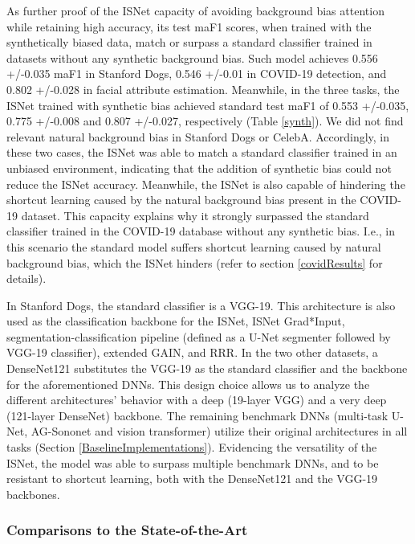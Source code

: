 \documentclass[fleqn,10pt]{wlscirep}
\begin{document}
{As further proof of the ISNet capacity of avoiding background bias attention while retaining high accuracy, its test maF1 scores, when trained with the synthetically biased data, match or surpass a standard classifier trained in datasets without any synthetic background bias. Such model achieves 0.556 +/-0.035 maF1 in Stanford Dogs, 0.546 +/-0.01 in COVID-19 detection, and 0.802 +/-0.028 in facial attribute estimation. Meanwhile, in the three tasks, the ISNet trained with synthetic bias achieved standard test maF1 of 0.553 +/-0.035, 0.775 +/-0.008 and 0.807 +/-0.027, respectively (Table \ref{synth}). We did not find relevant natural background bias in Stanford Dogs or CelebA. Accordingly, in these two cases, the ISNet was able to match a standard classifier trained in an unbiased environment, indicating that the addition of synthetic bias could not reduce the ISNet accuracy. Meanwhile, the ISNet is also capable of hindering the shortcut learning caused by the natural background bias present in the COVID-19 dataset. This capacity explains why it strongly surpassed the standard classifier trained in the COVID-19 database without any synthetic bias. I.e., in this scenario the standard model suffers shortcut learning caused by natural background bias, which the ISNet hinders (refer to section \ref{covidResults} for details).

In Stanford Dogs, the standard classifier is a VGG-19\cite{vggOriginal}. This architecture is also used as the classification backbone for the ISNet, ISNet Grad*Input, segmentation-classification pipeline (defined as a U-Net segmenter followed by VGG-19 classifier), extended GAIN, and RRR. In the two other datasets, a DenseNet121\cite{DenseNet} substitutes the VGG-19 as the standard classifier and the backbone for the aforementioned DNNs. This design choice allows us to analyze the different architectures' behavior with a deep (19-layer VGG) and a very deep (121-layer DenseNet) backbone. The remaining benchmark DNNs (multi-task U-Net, AG-Sononet and vision transformer) utilize their original architectures in all tasks (Section \ref{BaselineImplementations}). Evidencing the versatility of the ISNet, the model was able to surpass multiple benchmark DNNs, and to be resistant to shortcut learning, both with the DenseNet121 and the VGG-19 backbones.

\subsubsection{Comparisons to the State-of-the-Art}
\label{baselineComparisons}

}
\end{document}
